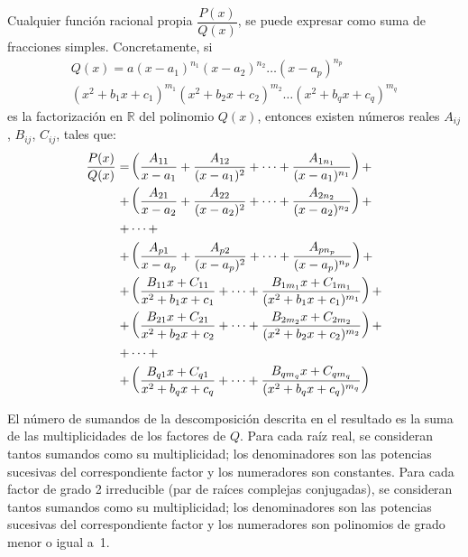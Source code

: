 \begin{proposicion}
Cualquier función racional propia $\dfrac{P(x)}{Q(x)}$, se puede expresar como suma de fracciones simples.
Concretamente, si
\begin{multline*}
Q(x)=a(x-a_1)^{n_1}(x-a_2)^{n_2}\dots (x-a_p)^{n_p}\\
(x^2+b_1x+c_1)^{m_1}(x^2+b_2x+c_2)^{m_2}\dots (x^2+b_qx+c_q)^{m_q}
\end{multline*}
es la factorización en $\mathbb{R}$ del polinomio $Q(x)$, entonces existen números reales
$A_{ij}$, $B_{ij}$, $C_{ij}$, tales que:
\begin{align}
\dfrac{P(x)}{Q(x)} = & \left(\dfrac{A_{11}}{x-a_1}+\dfrac{A_{12}}{(x-a_1)^2}+\cdots +\dfrac{A_{1n_1}}{(x-a_1)^{n_1}}\right)+\notag\\
 +&\left(\dfrac{A_{21}}{x-a_2}+\dfrac{A_{22}}{(x-a_2)^2}+\cdots +\dfrac{A_{2n_2}}{(x-a_2)^{n_2}}\right)+\notag\\
+& \cdots +\notag\\
+
&\left(\dfrac{A_{p1}}{x-a_p}+\dfrac{A_{p2}}{(x-a_p)^2}+\cdots +\dfrac{A_{pn_p}}{(x-a_p)^{n_p}}\right)+\notag \\
+&\left(\dfrac{B_{11}x+C_{11}}{x^2+b_1x+c_1}+\cdots+\dfrac{B_{1m_1}x+C_{1m_1}}{(x^2+b_1x+c_1)^{m_1}}\right)+\notag\\
+&\left(\dfrac{B_{21}x+C_{21}}{x^2+b_2x+c_2}+\cdots+\dfrac{B_{2m_2}x+C_{2m_2}}{(x^2+b_2x+c_2)^{m_2}}\right)+\notag\\
+&\cdots+\notag\\
+&\left(\dfrac{B_{q1}x+C_{q1}}{x^2+b_qx+c_q}+\cdots+\dfrac{B_{qm_q}x+C_{qm_q}}{(x^2+b_qx+c_q)^{m_q}}\right)\label{eq:desc-simples}
\end{align}
\end{proposicion}

El número de sumandos de la descomposición descrita en el resultado es la suma de las multiplicidades de los factores de $Q$.
Para cada raíz real, se consideran tantos sumandos como su multiplicidad;
los denominadores son las potencias sucesivas del correspondiente factor y los numeradores son constantes.
Para cada factor de grado 2 irreducible (par de raíces complejas conjugadas), se consideran tantos sumandos como su multiplicidad;
los denominadores son las potencias sucesivas del correspondiente factor y los numeradores son polinomios de grado menor o igual a~1. 

